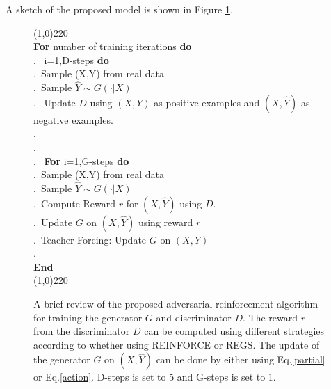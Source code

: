 \documentclass[11pt]{article}
\begin{document}
A sketch of the proposed model is shown in Figure \ref{fig:adver-reinforce}. 
\begin{figure}
\small
\line(1,0){220} \\
{\bf For} number of training iterations {\bf do} \\
.~\hspace{0.3cm}{\bf For} i=1,D-steps {\bf do} \\
.~\hspace{0.8cm}Sample (X,Y) from real data \\
.~\hspace{0.8cm}Sample $\hat{Y}\sim G(\cdot|X)$\\
.~\hspace{0.8cm} Update $D$ using $(X,Y)$ as positive examples and $(X,\hat{Y})$ as negative examples. \\
.~\hspace{0.3cm}{\bf End} \\
.\\
.~\hspace{0.2cm} {\bf For} i=1,G-steps {\bf do} \\
.~\hspace{0.8cm}Sample (X,Y) from real data \\
.~\hspace{0.8cm}Sample $\hat{Y}\sim G(\cdot|X)$ \\
.~\hspace{0.8cm}Compute Reward $r$ for $(X,\hat{Y})$ using $D$.\\
.~\hspace{0.8cm}Update $G$  on $(X,\hat{Y})$ using reward $r$\\
.~\hspace{0.8cm}Teacher-Forcing: Update $G$  on $(X,Y)$\\
.~\hspace{0.3cm}{\bf End} \\
{\bf End} \\
\line(1,0){220}
\caption{A brief review of the proposed adversarial reinforcement algorithm
for training the generator $G$ and discriminator $D$.
The reward $r$ from the discriminator $D$ can be computed using different strategies according to whether using REINFORCE or REGS.  
The update of the generator $G$ on $(X,\hat{Y})$ can be done by either using Eq.\ref{partial} or Eq.\ref{action}.
D-steps is set to 5 and G-steps is set to 1.}
\label{fig:adver-reinforce}
\end{figure}
\end{document}
